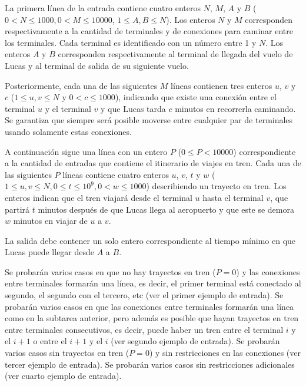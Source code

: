 \documentclass{oci}
\begin{document}
\begin{inputDescription}
  La primera línea de la entrada contiene cuatro enteros $N$, $M$, $A$ y $B$
  ($0 < N\leq 1000, 0 < M \leq 10000$, $1 \leq A, B\leq N$).
  Los enteros $N$ y $M$ corresponden respectivamente a la cantidad de terminales
  y de conexiones para caminar entre los terminales.
  Cada terminal es identificado con un número entre 1 y $N$.
  Los enteros $A$ y $B$ corresponden respectivamente al terminal de llegada del vuelo de Lucas 
  y al terminal de salida de su siguiente vuelo.

  Posteriormente, cada una de las siguientes $M$ líneas contienen tres enteros
  $u$, $v$ y $c$ ($1\leq u, v\leq N$ y $0<c\leq 1000$), indicando que existe una
  conexión entre el terminal $u$ y el terminal $v$ y que Lucas tarda $c$ minutos
  en recorrerla caminando.
  Se garantiza que siempre será posible moverse entre cualquier par de
  terminales usando solamente estas conexiones.

  A continuación sigue una línea con un entero $P$ ($0\leq P < 10000$)
  correspondiente a la cantidad de entradas que contiene el itinerario de viajes
  en tren.
  Cada una de las siguientes $P$ líneas contiene cuatro enteros $u$, $v$,
  $t$ y $w$ ($1 \leq u,v \leq N, 0\leq t\leq 10^9, 0 < w \leq 1000$)
  describiendo un trayecto en tren. 
  Los enteros indican que el tren viajará desde el terminal $u$ hasta el
  terminal $v$, que partirá $t$ minutos después de que Lucas llega al aeropuerto
  y que este se demora $w$ minutos en viajar de $u$ a $v$.
\end{inputDescription}

\begin{outputDescription}
  La salida debe contener un solo entero correspondiente al tiempo mínimo en que
  Lucas puede llegar desde $A$ a $B$.
\end{outputDescription}

\begin{scoreDescription}
   Se probarán varios casos en que no hay trayectos en tren ($P=0$) y
  las conexiones entre terminales formarán una línea, es decir, el primer
  terminal está conectado al segundo, el segundo con el tercero, etc (ver
  el primer ejemplo de entrada). 
   Se probarán varios casos en que las conexiones entre terminales formarán una línea 
  como en la subtarea anterior, pero además es posible que hayan
  trayectos en tren entre terminales consecutivos, es decir, puede haber un
  tren entre el terminal $i$ y el $i+1$ o entre el $i+1$ y el $i$ (ver segundo
  ejemplo de entrada).
   Se probarán varios casos sin trayectos en tren ($P=0$) y sin
  restricciones en las conexiones (ver tercer ejemplo de entrada).
   Se probarán varios casos sin restricciones adicionales (ver cuarto
  ejemplo de entrada).
\end{scoreDescription}

\begin{sampleDescription}
\end{sampleDescription}
\end{document}
